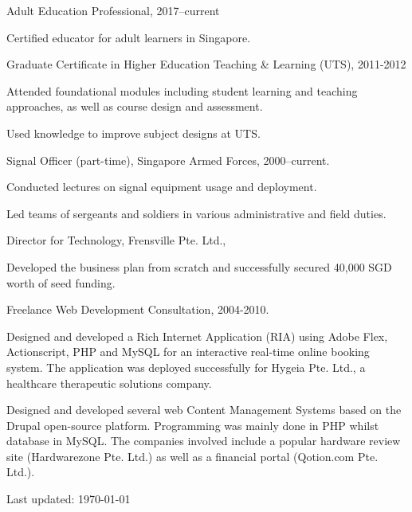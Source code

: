 \documentclass[10pt,a4paper]{article}
\renewenvironment{itemize}{
    \begin{list}{}{
            \setlength{\leftmargin}{1.5em}
            \setlength{\itemsep}{0.25em}
            \setlength{\parskip}{0pt}
            \setlength{\parsep}{0.25em}
        }
        }{
    \end{list}
}
\begin{document}
\begin{itemize}

    \item Adult Education Professional,
        2017--current
        \begin{itemize}
            \item Certified educator for adult learners in Singapore.
        \end{itemize}

    \item Graduate Certificate in Higher Education Teaching \& Learning (UTS),
        2011-2012
        \begin{itemize}
            \item Attended foundational modules including student learning and teaching
                approaches, as well as course design and assessment.
            \item Used knowledge to improve subject designs at UTS.
        \end{itemize}

    \item Signal Officer (part-time), Singapore Armed Forces,
        2000--current.
        \begin{itemize}
            \item Conducted lectures on signal equipment usage and deployment.
            \item Led teams of sergeants and soldiers in various administrative and field duties.
        \end{itemize}

    \item Director for Technology, Frensville Pte. Ltd.,
        \begin{itemize}
            \item Developed the business plan from scratch and successfully secured 40,000 SGD worth of seed funding.
        \end{itemize}

    \item Freelance Web Development Consultation,
        2004-2010.
        \begin{itemize}
            \item Designed and developed a Rich Internet Application (RIA) using Adobe Flex, Actionscript, PHP and MySQL for an interactive real-time online booking system. The application was deployed successfully for Hygeia Pte. Ltd., a healthcare therapeutic solutions company.

            \item Designed and developed several web Content Management Systems based on the Drupal open-source platform. Programming was mainly done in PHP whilst database in MySQL. The companies involved include a popular hardware review site (Hardwarezone Pte. Ltd.) as well as a financial portal (Qotion.com Pte. Ltd.).
        \end{itemize}
\end{itemize}


\medskip

\begin{center}
  \begin{small}
    Last updated: \today
  \end{small}
\end{center}
\end{document}
